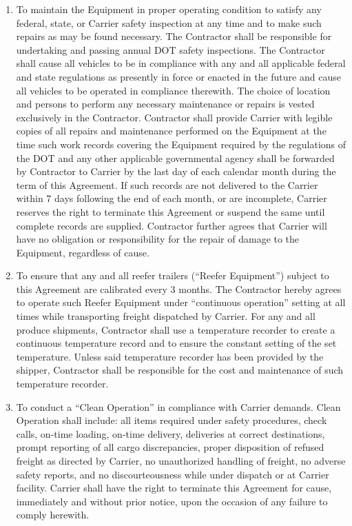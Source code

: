 \begin{enumerate}[
    ref = \SecondLevelEnumerator
]
    \item To maintain the Equipment in proper operating condition to
    satisfy any federal, state, or Carrier safety inspection at any time
    and to make such repairs as may be found necessary. The Contractor
    shall be responsible for undertaking and passing annual DOT safety
    inspections. The Contractor shall cause all vehicles to be in
    compliance with any and all applicable federal and state regulations as
    presently in force or enacted in the future and cause all vehicles to
    be operated in compliance therewith. The choice of location and persons
    to perform any necessary maintenance or repairs is vested exclusively
    in the Contractor. Contractor shall provide Carrier with legible copies
    of all repairs and maintenance performed on the Equipment at the time
    such work records covering the Equipment required by the regulations of
    the DOT and any other applicable governmental agency shall be forwarded
    by Contractor to Carrier by the last day of each calendar month during
    the term of this Agreement. If such records are not delivered to the
    Carrier within 7 days following the end of each month, or are
    incomplete, Carrier reserves the right to terminate this Agreement or
    suspend the same until complete records are supplied. Contractor
    further agrees that Carrier will have no obligation or responsibility
    for the repair of damage to the Equipment, regardless of cause.

    \item To ensure that any and all reefer trailers (``Reefer Equipment'')
    subject to this Agreement are calibrated every 3 months. The Contractor
    hereby agrees to operate such Reefer Equipment under ``continuous
    operation'' setting at all times while transporting freight dispatched
    by Carrier. For any and all produce shipments, Contractor shall use a
    temperature recorder to create a continuous temperature record and to
    ensure the constant setting of the set temperature. Unless said
    temperature recorder has been provided by the shipper, Contractor shall
    be responsible for the cost and maintenance of such temperature
    recorder.

    \item To conduct a ``Clean Operation'' in compliance with Carrier
    demands. Clean Operation shall include: all items required under safety
    procedures, check calls, on-time loading, on-time delivery, deliveries
    at correct destinations, prompt reporting of all cargo discrepancies,
    proper disposition of refused freight as directed by Carrier, no
    unauthorized handling of freight, no adverse safety reports, and no
    discourteousness while under dispatch or at Carrier facility. Carrier
    shall have the right to terminate this Agreement for cause, immediately
    and without prior notice, upon the occasion of any failure to comply
    herewith.


\end{enumerate}

